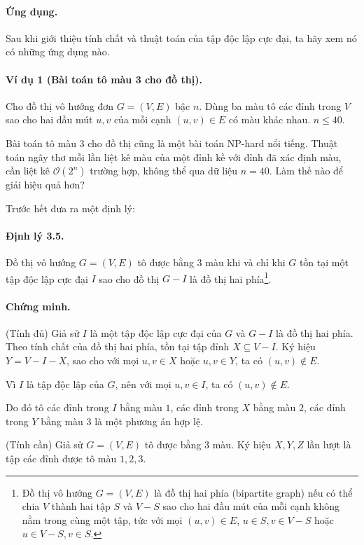 \documentclass[11pt]{article}
\newcommand{\Oh}{\mathcal{O}}
\begin{document}
\paragraph{Ứng dụng.}
Sau khi giới thiệu tính chất và thuật toán của tập độc lập cực đại, ta hãy xem
nó có những ứng dụng nào.

\paragraph{Ví dụ 1 (Bài toán tô màu 3 cho đồ thị).}
Cho đồ thị vô hướng đơn \(G=(V,E)\) bậc \(n\). Dùng ba màu tô các đỉnh trong
\(V\) sao cho hai đầu mút \(u,v\) của mỗi cạnh \((u,v)\in E\) có màu khác
nhau. \(n\le 40\).

Bài toán tô màu 3 cho đồ thị cũng là một bài toán NP-hard nổi tiếng. Thuật
toán ngây thơ mỗi lần liệt kê màu của một đỉnh kề với đỉnh đã xác định màu,
cần liệt kê \(\Oh(2^n)\) trường hợp, không thể qua dữ liệu \(n=40\). Làm thế
nào để giải hiệu quả hơn?

Trước hết đưa ra một định lý:

\paragraph{Định lý 3.5.}
Đồ thị vô hướng \(G=(V,E)\) tô được bằng 3 màu khi và chỉ khi \(G\) tồn tại một
tập độc lập cực đại \(I\) sao cho đồ thị \(G-I\) là đồ thị hai phía\footnote{Đồ
thị vô hướng \(G=(V,E)\) là đồ thị hai phía (bipartite graph) nếu có thể chia
\(V\) thành hai tập \(S\) và \(V-S\) sao cho hai đầu mút của mỗi cạnh không nằm
trong cùng một tập, tức với mọi \((u,v)\in E\), \(u\in S,v\in V-S\) hoặc
\(u\in V-S,v\in S\).}.

\paragraph{Chứng minh.}
(Tính đủ) Giả sử \(I\) là một tập độc lập cực đại của \(G\) và \(G-I\) là đồ
thị hai phía. Theo tính chất của đồ thị hai phía, tồn tại tập đỉnh
\(X\subseteq V-I\). Ký hiệu \(Y=V-I-X\), sao cho với mọi \(u,v\in X\) hoặc
\(u,v\in Y\), ta có \((u,v)\notin E\).

Vì \(I\) là tập độc lập của \(G\), nên với mọi \(u,v\in I\), ta có
\((u,v)\notin E\).

Do đó tô các đỉnh trong \(I\) bằng màu \(1\), các đỉnh trong \(X\) bằng màu
\(2\), các đỉnh trong \(Y\) bằng màu \(3\) là một phương án hợp lệ.

(Tính cần) Giả sử \(G=(V,E)\) tô được bằng 3 màu. Ký hiệu \(X,Y,Z\) lần lượt là
tập các đỉnh được tô màu \(1,2,3\).
\end{document}
